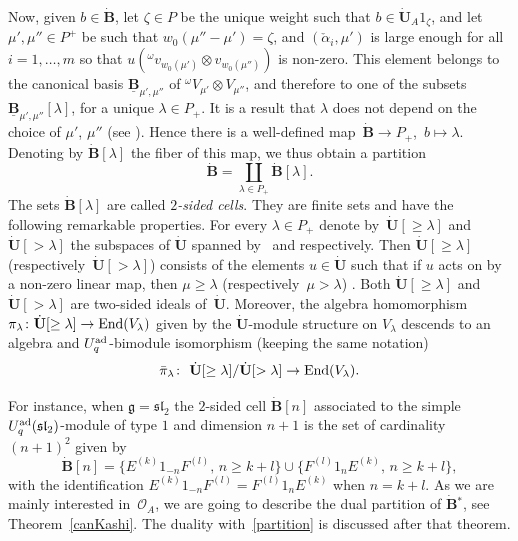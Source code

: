 \documentclass[pdftex]{sigma}
\numberwithin{equation}{section}
\theoremstyle{definition}
\newcommand{\Oo}{{\mathcal O}}
\newcommand{\ra}{\rightarrow}
\begin{document}
Now, given $b\in \dot{\mathbf{B}}$, let $\zeta\in P$ be the unique weight such that $b \in \dot{\mathbf{U}}_A 1_\zeta$, and let ${\mu', \mu''\in P^+}$ be such that $w_0(\mu''-\mu')=\zeta$, and $(\check{\alpha}_i,\mu')$ is large enough for all $i=1,\dots,m$ so that $u({}^\omega v_{w_0(\mu')}\otimes v_{w_0(\mu'')})$ is non-zero. This element belongs to the canonical basis $\underline{\mathbf{B}}_{\mu',\mu''}$ of ${}^{\omega}V_{\mu'}\otimes V_{\mu''}$, and therefore to one of the subsets $\underline{\mathbf{B}}_{\mu',\mu''}[\lambda]$, for a unique $\lambda\in P_+$. It is a result that $\lambda$ does not depend on the choice of $\mu'$, $\mu''$ (see \cite[Section~29.1.1]{Lusztig}). Hence there is a well-defined map~${\dot{\mathbf{B}}\ra P_+}$,~$b\mapsto \lambda$. Denoting by $\dot{\mathbf{B}} [\lambda]$ the fiber of this map, we thus obtain a partition
\begin{equation}\label{partition} \dot{\mathbf{B}} = \coprod_{\lambda\in P_+}\dot{\mathbf{B}} [\lambda]. \end{equation}
The sets $\dot{\mathbf{B}} [\lambda]$ are called {\it $2$-sided cells}. They are finite sets and have the following remarkable properties. For every $\lambda\in P_+$ denote by~${\dot{\mathbf{U}} [\geq \lambda]}$ and $\dot{\mathbf{U}} [> \lambda]$ the subspaces of $\dot{\mathbf{U}}$ spanned by~ and  respectively. Then $\dot{\mathbf{U}} [\geq \lambda]$ (respectively~${\dot{\mathbf{U}} [> \lambda]}$) consists of the elements $u\in \dot{\mathbf{U}}$ such that if $u$ acts on  by a non-zero linear map, then $\mu\geq \lambda$ (respectively~${\mu> \lambda}$) \cite[Lemmas~29.1.3 and~29.1.4]{Lusztig}. Both $\dot{\mathbf{U}} [\geq \lambda]$ and $\dot{\mathbf{U}} [> \lambda]$ are two-sided ideals of~$\dot{\mathbf{U}}$. Moreover, the algebra homomorphism $\pi_\lambda\colon \dot{\mathbf{U}} [\geq\lambda] \ra {\rm End}(V_\lambda)$ given by the $\dot{\mathbf{U}}$-module structure on $V_\lambda$ descends to an algebra and $U_q^{\rm ad}$-bimodule isomorphism (keeping the same notation) \cite[Proposition~29.2.2]{Lusztig}
\begin{equation}\label{pimuiso} \bar{\pi}_\lambda\colon\ \dot{\mathbf{U}} [\geq \lambda]/ \dot{\mathbf{U}} [> \lambda] \ra {\rm End}(V_\lambda) . \end{equation}

For instance, when $\mathfrak{g}={\mathfrak{sl}_2}$ the $2$-sided cell $\dot{\mathbf{B}} [n]$ associated to the simple $U_q^{\rm ad}({\mathfrak{sl}_2})$-module of type $1$ and dimension $n+1$ is the set of cardinality $(n+1)^2$ given by \cite[Section~29.4.3]{Lusztig}
\begin{equation}\label{2sidedcellsl2}
\dot{\mathbf{B}} [n] =\big\{E^{(k)}1_{-n}F^{(l)},\,n\geq k+l \big\} \cup \big\{F^{(l)}1_nE^{(k)},\,n\geq k+l\big\},
\end{equation}
with the identification $E^{(k)}1_{-n}F^{(l)} = F^{(l)}1_nE^{(k)}$ when $n=k+l$. As we are mainly interested in~$\Oo_A$, we are going to describe the dual partition of $\dot{\mathbf{B}} {}^*$, see Theorem~\ref{canKashi}. The duality with~\eqref{partition} is discussed after that theorem.
\end{document}
